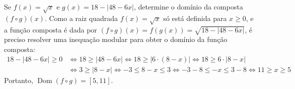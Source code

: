 \documentclass[12pt,a4paper]{article}
\newcommand*\dom[1]{\operatorname{Dom}\left(#1\right)}
\begin{document}
\begin{ExerciseList}
\Exercise[title={2,0}] Se $f(x) = \sqrt{x}$ e $g(x) = 18 - |48 - 6x|$, determine o domínio da composta $(f \circ g)(x)$.
\Answer Como a raiz quadrada $f(x) = \sqrt{x}$ só está definida para $x \geq 0$, e a função composta é dada por $(f \circ g)(x) = f (g(x)) = \sqrt{18 - |48 - 6x|}$, é preciso resolver uma inequação modular para obter o domínio da função composta:
\begin{align*}
  18 - |48 - 6x| \geq 0
  & \Leftrightarrow
  18 \geq |48 - 6x|
  \Leftrightarrow
  18 \geq |6\cdot (8 - x)|
  \Leftrightarrow
  18 \geq 6 \cdot|8 - x| \\
  & \Leftrightarrow
  3 \geq |8 - x|
  \Leftrightarrow
  -3 \leq 8 - x \leq 3
  \Leftrightarrow
  -3 - 8 \leq -x \leq 3 - 8
  \Leftrightarrow
  11 \geq x \geq 5
\end{align*}
Portanto, $\dom{f\circ g} = [5, 11]$.



\end{ExerciseList}
\end{document}
